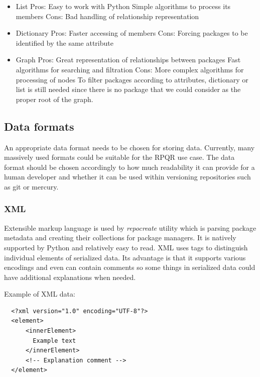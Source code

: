 \newpage

\begin{itemize}
  \item List
    \subitem Pros:
    \subsubitem Easy to work with Python
    \subsubitem Simple algorithms to process its members
    \subitem Cons:
    \subsubitem Bad handling of relationship representation
  \item Dictionary
    \subitem Pros:
    \subsubitem Faster accessing of members
    \subitem Cons:
    \subsubitem Forcing packages to be identified by the same attribute
  \item Graph
    \subitem Pros:
    \subsubitem Great representation of relationships between packages
    \subsubitem Fast algorithms for searching and filtration
    \subitem Cons:
    \subsubitem More complex algorithms for processing of nodes
    \subsubitem To filter packages according to attributes, dictionary or list is still needed
                since there is no package that we could consider as the proper root of the graph.
\end{itemize}

\subsection*{Data formats}
\label{sec:dataformats}
An appropriate data format needs to be chosen for storing data. Currently, many massively
used formats could be suitable for the RPQR use case. The data format should be chosen accordingly to
how much readability it can provide for a human developer and whether it can be used within versioning
repositories such as git or mercury.

\subsubsection*{XML}
Extensible markup language\cite{XMLFormat} is used by \textit{repocreate} utility which is parsing package metadata and creating
their collections for package managers. It is natively supported by Python and relatively easy to
read. XML uses tags to distinguish individual elements of serialized data. Its advantage
is that it supports various encodings and even can contain comments so some things in serialized
data could have additional explanations when needed.

\newpage

Example of XML data:
\begin{lstlisting}
  <?xml version="1.0" encoding="UTF-8"?>
  <element>
      <innerElement>
        Example text
      </innerElement>
      <!-- Explanation comment -->
  </element>
\end{lstlisting}

